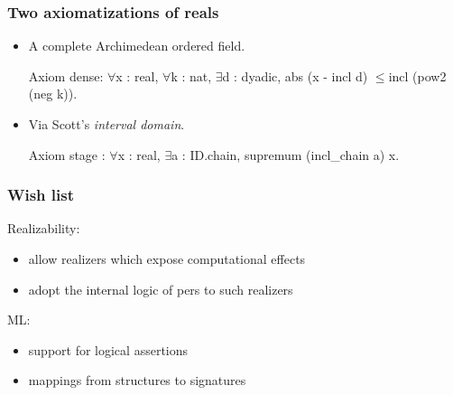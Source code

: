 \documentclass[compress,t]{beamer}
\newcommand{\iForall}{$\forall$}
\newcommand{\iExists}{$\exists$}
\newcommand{\iLeq}{$\leq$}
\begin{document}
\begin{frame}[fragile]
  \frametitle{Two axiomatizations of reals}

  \begin{itemize}
  \item<1-> A complete Archimedean ordered field.
\begin{source}
Axiom dense:
  \iForall x : real, \iForall k : nat, \iExists d : dyadic,
    abs (x - incl d) \iLeq incl (pow2 (neg k)).
\end{source}
% 
\item<2-> Via Scott's \emph{interval domain}.
\begin{source}
Axiom stage :
  \iForall x : real, \iExists a : ID.chain,
    supremum (incl_chain a) x.
\end{source}
\end{itemize}
\end{frame}

\begin{frame}
  \frametitle{Wish list}

  Realizability:
  \begin{itemize}
  \item allow realizers which expose computational effects
  \item adopt the internal logic of pers to such realizers
  \end{itemize}

  ML:
  \begin{itemize}
  \item support for logical assertions
  \item mappings from structures to signatures
  \end{itemize}
\end{frame}
\end{document}
